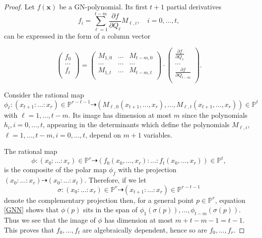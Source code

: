 \documentclass[11pt]{article}   %
\theoremstyle{definition}
\numberwithin{Theorem}{section} \numberwithin{equation}{section}
\newcommand{\p}{{\mathbb P}}
\newcommand{\map}{\dasharrow}
\begin{document}
{\begin{proof} Let $f(\mathbf x)$ be a GN-polynomial. Its first $t+1$ partial derivatives
$$f_i=\sum_{\ell=1}^ {t-m}
\frac {\partial f}{\partial Q_\ell}M_{\ell,i}, \quad i=0,...,t,$$
can be expressed in the form of a column vector

\begin{equation}\label{GNN}
\left ( \begin{matrix}
f_0\\
\ldots\\
f_t \\
\end{matrix}\right)
=\left ( \begin{matrix}
M_{1,0}&\ldots&M_{t-m,0} \\
\ldots & \ldots& \ldots \\
M_{1,t}&\ldots&M_{t-m,t} \\
\end{matrix} \right)
\cdot
 \left (\begin {matrix}
 \frac {\partial f}{\partial Q_1}\\
\ldots\\
\frac {\partial f}{\partial Q_{t-m}} \\
\end{matrix}\right).
\end{equation}

Consider the rational map
$$\phi_\ell: (x_{t+1}:\ldots :x_r)\in \p^ {r-t-1}\map
(M_{\ell,0}(x_{t+1},\ldots , x_r),\ldots,M_{\ell,t}(x_{t+1},\ldots,x_r))\in \p^
t$$ with $\ell=1,...,t-m$. Its image has dimension at most $m$ since
the polynomials $h_i, i=0,\ldots,t$, appearing in the determinants
which define the polynomials $M_{\ell,i}$, $\ell=1,...,t-m,
i=0,...,t$, depend on $m+1$ variables.

The rational map
$$\phi: (x_0:\ldots :x_r)\in \p^ r\map
(f_0(x_0,\ldots,x_r):\ldots :f_t(x_0,\ldots,x_r))\in \p^ t,$$ is the composite
of the polar map $\phi_f$ with the projection $(x_0:\ldots :x_r)\map
(x_0:\ldots :x_t)$. Therefore, if we let
$$\sigma: (x_0:\ldots :x_r)\in \p^ r\map (x_{t+1}:\ldots :x_r)\in \p^ {r-t-1}$$
denote the complementary  projection then, for a general point $p\in
\p^ r$,  equation \eqref{GNN} shows that $\phi(p)$ sits in the span
of $\phi_1(\sigma(p)),...,\phi_{t-m}(\sigma(p))$. Thus we see that
the image of $\phi$ has dimension at most $m+t-m-1=t-1$. This proves
that $f_0,...,f_t$ are algebraically dependent, hence so are
$f_0,...,f_r$.
\end{proof}

}
\end{document}
